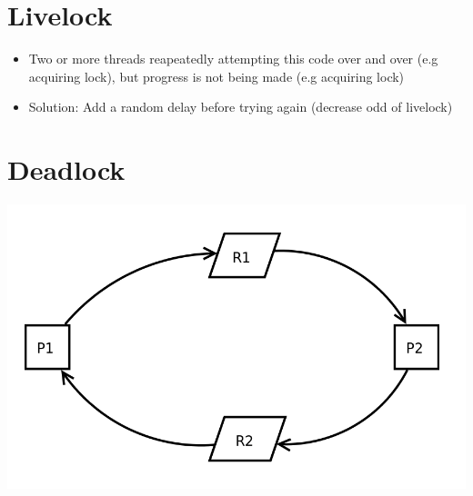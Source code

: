 \documentclass[12pt]{article}
\begin{document}
\section{Livelock}

\begin{itemize}
    \item Two or more threads reapeatedly attempting this code over and over (e.g acquiring lock), but progress is
    not being made (e.g acquiring lock)
    \item Solution: Add a random delay before trying again (decrease odd of livelock)
\end{itemize}

\section{Deadlock}

\begin{center}
\includegraphics[width=0.6\linewidth]{images/midterm_2_solution_11.png}
\end{center}
\end{document}
